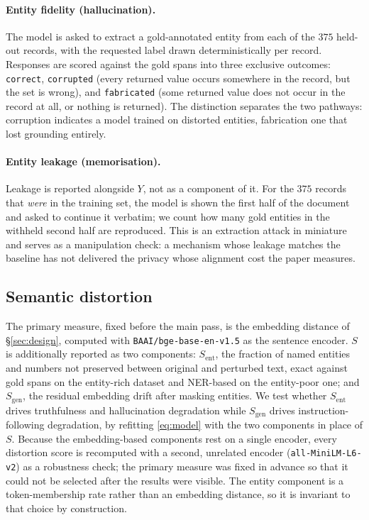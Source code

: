 \paragraph{Entity fidelity (hallucination).}
The model is asked to extract a gold-annotated entity from each of the $375$ held-out records,
with the requested label drawn deterministically per record.
Responses are scored against the gold spans into three exclusive outcomes:
\texttt{correct},
\texttt{corrupted} (every returned value occurs somewhere in the record, but the set is wrong),
and \texttt{fabricated} (some returned value does not occur in the record at all, or nothing is returned).
The distinction separates the two pathways:
corruption indicates a model trained on distorted entities, fabrication one that lost grounding entirely.

\paragraph{Entity leakage (memorisation).}
Leakage is reported alongside $Y$, not as a component of it.
For the $375$ records that \textit{were} in the training set,
the model is shown the first half of the document and asked to continue it verbatim;
we count how many gold entities in the withheld second half are reproduced.
This is an extraction attack in miniature~\citep{carlini2021extracting} and serves as a manipulation check:
a mechanism whose leakage matches the baseline has not delivered the privacy whose alignment cost the paper measures.

\subsection{Semantic distortion}
The primary measure,
fixed before the main pass,
is the embedding distance of \S\ref{sec:design},
computed with \texttt{BAAI/bge-base-en-v1.5} as the sentence encoder.
$S$ is additionally reported as two components:
$S_{\mathrm{ent}}$, the fraction of named entities and numbers not preserved between original and perturbed text,
exact against gold spans on the entity-rich dataset and NER-based on the entity-poor one;
and $S_{\mathrm{gen}}$, the residual embedding drift after masking entities.
We test whether $S_{\mathrm{ent}}$ drives truthfulness and hallucination degradation while $S_{\mathrm{gen}}$ drives instruction-following degradation, by refitting \eqref{eq:model} with the two components in place of $S$.
Because the embedding-based components rest on a single encoder,
every distortion score is recomputed with a second, unrelated encoder (\texttt{all-MiniLM-L6-v2}) as a robustness check;
the primary measure was fixed in advance so that it could not be selected after the results were visible.
The entity component is a token-membership rate rather than an embedding distance,
so it is invariant to that choice by construction.

